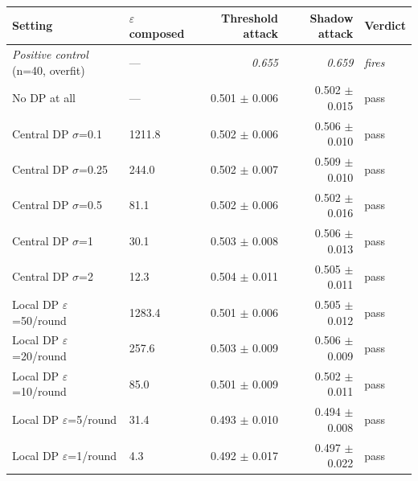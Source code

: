 \begin{tabular}{llrrl}
    \toprule
    Setting & $\varepsilon$ composed & Threshold attack & Shadow attack & Verdict \\
    \midrule
    \emph{Positive control} (n=40, overfit) & --- & \emph{0.655} & \emph{0.659} & \emph{fires} \\
    \midrule
    No DP at all & --- & 0.501 $\pm$ 0.006 & 0.502 $\pm$ 0.015 & pass \\
    Central DP $\sigma$=0.1 & 1211.8 & 0.502 $\pm$ 0.006 & 0.506 $\pm$ 0.010 & pass \\
    Central DP $\sigma$=0.25 & 244.0 & 0.502 $\pm$ 0.007 & 0.509 $\pm$ 0.010 & pass \\
    Central DP $\sigma$=0.5 & 81.1 & 0.502 $\pm$ 0.006 & 0.502 $\pm$ 0.016 & pass \\
    Central DP $\sigma$=1 & 30.1 & 0.503 $\pm$ 0.008 & 0.506 $\pm$ 0.013 & pass \\
    Central DP $\sigma$=2 & 12.3 & 0.504 $\pm$ 0.011 & 0.505 $\pm$ 0.011 & pass \\
    Local DP $\varepsilon$=50/round & 1283.4 & 0.501 $\pm$ 0.006 & 0.505 $\pm$ 0.012 & pass \\
    Local DP $\varepsilon$=20/round & 257.6 & 0.503 $\pm$ 0.009 & 0.506 $\pm$ 0.009 & pass \\
    Local DP $\varepsilon$=10/round & 85.0 & 0.501 $\pm$ 0.009 & 0.502 $\pm$ 0.011 & pass \\
    Local DP $\varepsilon$=5/round & 31.4 & 0.493 $\pm$ 0.010 & 0.494 $\pm$ 0.008 & pass \\
    Local DP $\varepsilon$=1/round & 4.3 & 0.492 $\pm$ 0.017 & 0.497 $\pm$ 0.022 & pass \\
    \bottomrule
\end{tabular}
